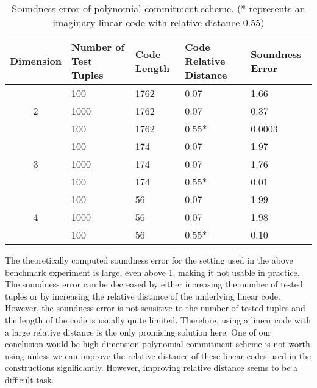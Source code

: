\begin{table}[h!]
\centering
\begin{tabular}{| c | m{5em} | m{5em} | m{5em}  | m{5em}|} 
 \hline
 Dimension & Number of Test Tuples & Code Length & Code Relative Distance & Soundness Error \\ [0.5ex] 
 \hline\hline
 
 \multirow{3}{*}{2} & 100 & 1762 & 0.07 & 1.66  \\
  & 1000 & 1762 & 0.07 & 0.37  \\
  & 100 & 1762 & 0.55* & 0.0003  \\
 \hline
 
 \multirow{3}{*}{3} & 100 & 174  & 0.07 & 1.97 \\
 & 1000 & 174  & 0.07 & 1.76 \\
 & 100 & 174  & 0.55* & 0.01 \\
 \hline
 
 \multirow{3}{*}{4} & 100 & 56   & 0.07 & 1.99  \\
  & 1000 & 56   & 0.07 & 1.98  \\
  & 100 & 56   & 0.55* & 0.10  \\ 
 \hline
\end{tabular}
\caption{Soundness error of polynomial commitment scheme. (* represents an imaginary linear code with relative distance 0.55)}
\label{table:benchmark-pc-3}
\end{table}

The theoretically computed soundness error for the setting used in the above benchmark experiment is large, even above 1, making it not usable in practice. The soundness error can be decreased by either increasing the number of tested tuples or by increasing the relative distance of the underlying linear code. However, the soundness error is not sensitive to the number of tested tuples and the length of the code is usually quite limited. Therefore, using a linear code with a large relative distance is the only promising solution here. One of our conclusion would be high dimension polynomial commitment scheme is not worth using unless we can improve the relative distance of these linear codes used in the constructions significantly. However, improving relative distance seems to be a difficult task.